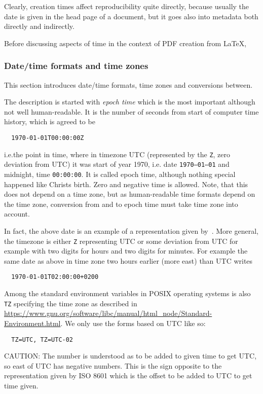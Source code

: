 \documentclass[a4paper, english]{article}%
\begin{document}
Clearly, creation times affect reproducibility quite directly, 
because usually the date is given in the head page of a document, 
but it goes also into metadata both directly and indirectly. 

Before discussing aspects of time in the context of PDF creation from \LaTeX, 


\subsubsection{Date/time formats and time zones}\label{subsubsec:dateTimeZones}

This section introduces date/time formats, time zones and conversions between. 

The description is started with \emph{epoch time} 
which is the most important although not well human-readable. 
It is the number of seconds from start of computer time history, 
which is agreed to be 
%
\begin{verbatim}
  1970-01-01T00:00:00Z
\end{verbatim}
%
i.e.\@ the point in time, where in timezone UTC (represented by the \texttt Z, zero deviation from UTC) 
it was start of year 1970, i.e. date \texttt{1970--01--01} and midnight, time \texttt{00:00:00}. 
It is called epoch time, although nothing special happened like Christs birth. 
Zero and negative time is allowed. 
Note, that this does not depend on a time zone, 
but as human-readable time formats depend on the time zone, 
conversion from and to epoch time must take time zone into account. 

In fact, the above date is an example of a representation given by~\cite{ISO8601-1}. 
More general, the timezone is either \texttt Z representing UTC 
or some deviation from UTC for example with two digits for hours and two digits for minutes. 
For example the same date as above in time zone two hours earlier (more east) than UTC writes 
%
\begin{verbatim}
  1970-01-01T02:00:00+0200
\end{verbatim}

Among the standard environment variables in POSIX operating systems 
is also \texttt{TZ} specifying the time zone 
as described in \url{https://www.gnu.org/software/libc/manual/html_node/Standard-Environment.html}. 
We only use the forms based on UTC like so: 
%
\begin{verbatim}
  TZ=UTC, TZ=UTC-02
\end{verbatim}
%
CAUTION: The number is understood as to be added to given time to get UTC, 
so east of UTC has negative numbers. 
This is the sign opposite to the representation given by ISO 8601 
which is the offset to be added to UTC to get time given. 
\end{document}
